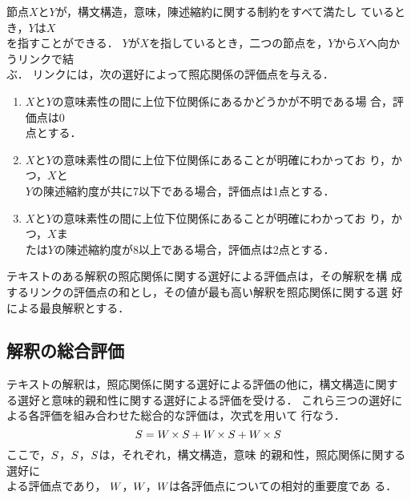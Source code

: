 節点$X$と$Y$が，\hspace*{-0.2mm}構文構造，\hspace*{-0.2mm}意味，\hspace*{-0.2mm}陳述縮約に関する制約をすべて満たし
ているとき，\hspace*{-0.2mm}$Y$は$X$\\を指すことができる．
$Y$が$X$を指しているとき，二つの節点を，$Y$から$X$へ向かうリンクで結\\ぶ．
リンクには，次の選好によって照応関係の評価点を与える．
\begin{enumerate}
\item $X$と$Y$の意味素性の間に上位下位関係にあるかどうかが不明である場
合，評価点は0\\点とする．
\item $X$と$Y$の意味素性の間に上位下位関係にあることが明確にわかってお
り，かつ，$X$と\\$Y$の陳述縮約度が共に7以下である場合，評価点は1点とする．
\item $X$と$Y$の意味素性の間に上位下位関係にあることが明確にわかってお
り，かつ，$X$ま\\たは$Y$の陳述縮約度が8以上である場合，評価点は2点とする．
\end{enumerate}

テキストのある解釈の照応関係に関する選好による評価点は，その解釈を構
成するリンクの評価点の和とし，その値が最も高い解釈を照応関係に関する選
好による最良解釈とする．

\subsection{解釈の総合評価}
\label{sec:twg:balance}

テキストの解釈は，照応関係に関する選好による評価の他に，構文構造に関す
る選好と意味的親和性に関する選好による評価を受ける．
これら三つの選好による各評価を組み合わせた総合的な評価は，次式を用いて
行なう．
\begin{equation}
S = W_{} \times S_{} + W_{} \times S_{} + W_{}
\times S_{}
\label{eq:balance}
\end{equation}
ここで，$S_{}$，$S_{}$，$S_{}$は，それぞれ，構文構造，意味
的親和性，照応関係に関する選好に\\よる評価点であり，
$W_{}$，$W_{}$，$W_{}$は各評価点についての相対的重要度であ
る．

